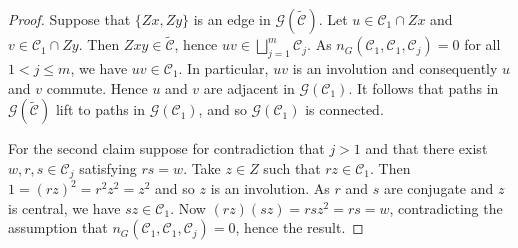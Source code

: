 \documentclass[11pt,a4paper]{amsart}
\theoremstyle{plain}
\theoremstyle{definition}
\theoremstyle{remark}
\newtheorem{lemma}[definition]{Lemma}
\newcounter{claim}[definition]
\theoremstyle{remark}
\theoremstyle{remark}
\theoremstyle{definition}
\newcommand{\twist}[1]{%
  {}^{2}\!#1%
}
\newcommand{\GG}{\mathcal{G}}
\DeclareMathOperator{\B}{B}
\DeclareMathOperator{\SL}{SL}
\DeclarePairedDelimiter{\gen}{\langle}{\rangle}
\begin{document}
\begin{proof} Suppose that $\{Zx,Zy\}$ is an edge in $\GG(\widetilde{\mathcal C})$. Let $u\in \mathcal C_1 \cap Zx$ and $v \in \mathcal C_1 \cap Zy$. Then $Z xy\in \widetilde {\mathcal{C}}$, hence $uv \in \bigsqcup_{j=1}^m\mathcal{C}_j$. As $n_G(\mathcal{C}_1,\mathcal{C}_1,\mathcal{C}_j)=0$ for all $1<j\le m$, we have $uv \in \mathcal C_1$. In particular, $uv$ is an involution and consequently $u$ and $v$ commute. Hence $u$ and $v$ are adjacent in $\GG(\mathcal{C}_1)$. It follows that paths in $\GG(\widetilde{\mathcal{C}})$ lift to paths in $\GG(\mathcal{C}_1)$, and so
$\GG(\mathcal {C}_1)$ is connected.


For the second claim suppose for contradiction that $j>1$ and that there exist $w,r,s\in \mathcal{C}_j$ satisfying $rs=w$. Take $z\in Z$ such that $rz\in\mathcal{C}_1$. Then $1=(rz)^2=r^2z^2=z^2$ and so $z$ is an involution. As $r$ and $s$ are conjugate and $z$ is central, we have $sz\in \mathcal C_1$. Now  $(rz)(sz)=rsz^2=rs=w$, contradicting the assumption that $n_G(\mathcal{C}_1,\mathcal{C}_1,\mathcal{C}_j)=0$, hence the result.
\end{proof}




\end{document}
